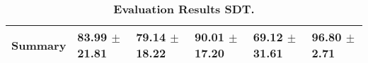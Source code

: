 \begin{table}[htb]
{\begin{tabular}{llllll}
\midrule
\textbf{Summary                                  } &                  \phantom{0}83.99 $\pm$ 21.81 &                      \phantom{0}79.14 $\pm$ 18.22 &                  \phantom{0}90.01 $\pm$ 17.20 &                  \phantom{0}69.12 $\pm$ 31.61 &  \phantom{0}96.80 $\pm$ \phantom{0}2.71 \\
\bottomrule
\end{tabular}%
}
\caption{\textbf{Evaluation Results SDT.}}
\label{tab:eval-results}
\end{table}


